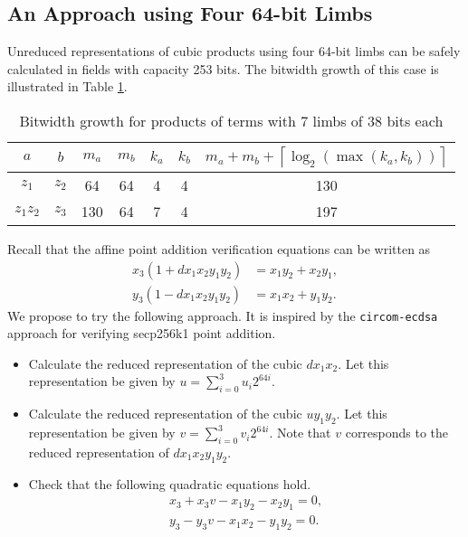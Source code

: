 \documentclass[a4paper, 12pt]{article}
\begin{document}
\newpage
\subsection{An Approach using Four 64-bit Limbs}%
\label{subsec:an_approach_using_four_64_bit_limbs}
Unreduced representations of cubic products using four 64-bit limbs can be safely calculated in fields with capacity 253 bits. The bitwidth growth of this case is illustrated in Table \ref{tab:limb64}.
\begin{table}[h]
  \centering
  \begin{tabular}{c|c|c|c|c|c|c}
    $a$ & $b$ & $m_a$ & $m_b$ & $k_a$ & $k_b$ & $m_a+m_b+\left\lceil \log_2 \left( \max\left( k_a, k_b \right) \right) \right\rceil$ \\ \hline
    $z_1$ & $z_2$ & 64 & 64 & 4 & 4 & 130 \\ \hline
    $z_1z_2$ & $z_3$ & 130 & 64 & 7 & 4 & 197 \\ \hline
  \end{tabular}
  \caption{Bitwidth growth for products of terms with 7 limbs of 38 bits each}
  \label{tab:limb64}
\end{table}

Recall that the affine point addition verification equations can be written as
\begin{align}
  x_3(1+dx_1x_2y_1y_2) &= x_1y_2 + x_2y_1,\\
  y_3(1-dx_1x_2y_1y_2) &= x_1x_2 + y_1y_2.
  \label{eqn:additionAffineVerification}
\end{align}
We propose to try the following approach. It is inspired by the \texttt{circom-ecdsa} approach for verifying secp256k1 point addition.
\begin{itemize}
  \item Calculate the reduced representation of the cubic $dx_1x_2$. Let this representation be given by $u = \sum_{i=0}^{3}u_i 2^{64i}$.
  \item Calculate the reduced representation of the cubic $uy_1y_2$. Let this representation be given by $v = \sum_{i=0}^{3}v_i 2^{64i}$. Note that $v$ corresponds to the reduced representation of $dx_1x_2y_1y_2$.
  \item Check that the following quadratic equations hold.
    \begin{align*}
      x_3 + x_3 v - x_1y_2 - x_2y_1 = 0,\\
      y_3 - y_3 v - x_1x_2 - y_1y_2 = 0.\\
    \end{align*}
\end{itemize}
\end{document}
